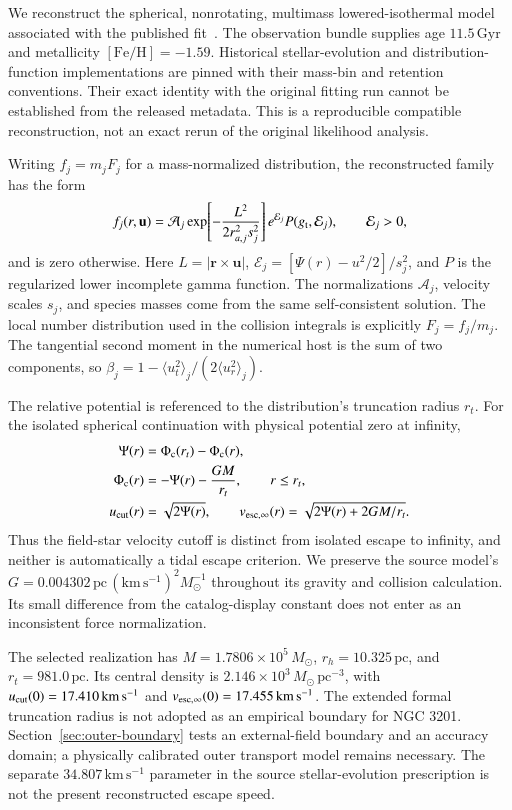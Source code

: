 \documentclass[aps,prd,reprint,amsmath,amssymb,superscriptaddress,nofootinbib,longbibliography,floatfix]{revtex4-2}
\begin{document}
We reconstruct the spherical, nonrotating, multimass lowered-isothermal model associated with the published fit~\cite{Gieles2015,Dickson2023,Dickson2024}. The observation bundle supplies age $11.5\,\mathrm{Gyr}$ and metallicity $[\mathrm{Fe/H}]=-1.59$. Historical stellar-evolution and distribution-function implementations are pinned with their mass-bin and retention conventions. Their exact identity with the original fitting run cannot be established from the released metadata. This is a reproducible compatible reconstruction, not an exact rerun of the original likelihood analysis.

Writing $f_j=m_jF_j$ for a mass-normalized distribution, the reconstructed family has the form
\begin{equation}
f_j(r,\mathbf u)=\mathcal A_j
\exp\!\left[-\frac{L^2}{2r_{a,j}^2s_j^2}\right]
e^{\mathcal E_j}P(g_{\rm t},\mathcal E_j),
\qquad \mathcal E_j>0,
\label{eq:lowered-df}
\end{equation}
and is zero otherwise. Here $L=|\mathbf r\times\mathbf u|$,
$\mathcal E_j=[\Psi(r)-u^2/2]/s_j^2$, and $P$ is the regularized lower incomplete gamma function. The normalizations $\mathcal A_j$, velocity scales $s_j$, and species masses come from the same self-consistent solution. The local number distribution used in the collision integrals is explicitly $F_j=f_j/m_j$. The tangential second moment in the numerical host is the sum of two components, so
$\beta_j=1-\langle u_t^2\rangle_j/(2\langle u_r^2\rangle_j)$.

The relative potential is referenced to the distribution's truncation radius $r_t$. For the isolated spherical continuation with physical potential zero at infinity,
\begin{align}
\Psi(r)&=\Phi_{\rm c}(r_t)-\Phi_{\rm c}(r),\\
\Phi_{\rm c}(r)&=-\Psi(r)-\frac{GM}{r_t},\qquad r\leq r_t,\\
u_{\rm cut}(r)&=\sqrt{2\Psi(r)},\qquad
v_{\rm esc,\infty}(r)=\sqrt{2\Psi(r)+2GM/r_t}.
\label{eq:cutoff-escape}
\end{align}
Thus the field-star velocity cutoff is distinct from isolated escape to infinity, and neither is automatically a tidal escape criterion. We preserve the source model's $G=0.004302\,\mathrm{pc}\,(\mathrm{km\,s^{-1}})^2M_\odot^{-1}$ throughout its gravity and collision calculation. Its small difference from the catalog-display constant does not enter as an inconsistent force normalization.

The selected realization has $M=1.7806\times10^5\,M_\odot$, $r_h=10.325\,\mathrm{pc}$, and $r_t=981.0\,\mathrm{pc}$. Its central density is $2.146\times10^3\,M_\odot\,\mathrm{pc}^{-3}$, with $u_{\rm cut}(0)=17.410\,\mathrm{km\,s^{-1}}$ and $v_{\rm esc,\infty}(0)=17.455\,\mathrm{km\,s^{-1}}$. The extended formal truncation radius is not adopted as an empirical boundary for NGC 3201. Section~\ref{sec:outer-boundary} tests an external-field boundary and an accuracy domain; a physically calibrated outer transport model remains necessary. The separate $34.807\,\mathrm{km\,s^{-1}}$ parameter in the source stellar-evolution prescription is not the present reconstructed escape speed.
\end{document}
